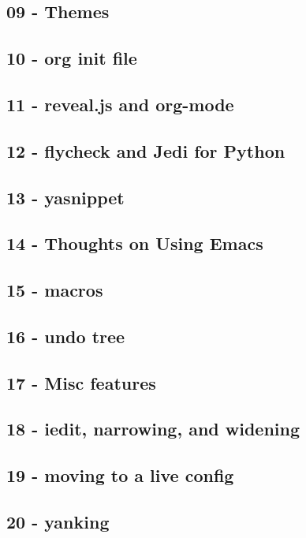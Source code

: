 \documentclass[11pt]{article}
\begin{document}
\subsection{09 - Themes}
\label{sec:org40b890b}
\subsection{10 - org init file}
\label{sec:org11a1e7f}
\subsection{11 - reveal.js and org-mode}
\label{sec:orgf34ba6d}
\subsection{12 - flycheck and Jedi for Python}
\label{sec:orgcaee279}
\subsection{13 - yasnippet}
\label{sec:orgd6c4c19}
\subsection{14 - Thoughts on Using Emacs}
\label{sec:orgd5f8911}
\subsection{15 - macros}
\label{sec:org127064c}
\subsection{16 - undo tree}
\label{sec:orgd822dd7}
\subsection{17 - Misc features}
\label{sec:orgf936b7b}
\subsection{18 - iedit, narrowing, and widening}
\label{sec:org9accfe5}
\subsection{19 - moving to a live config}
\label{sec:org19bc365}
\subsection{20 - yanking}
\label{sec:orgcc30691}
\end{document}
